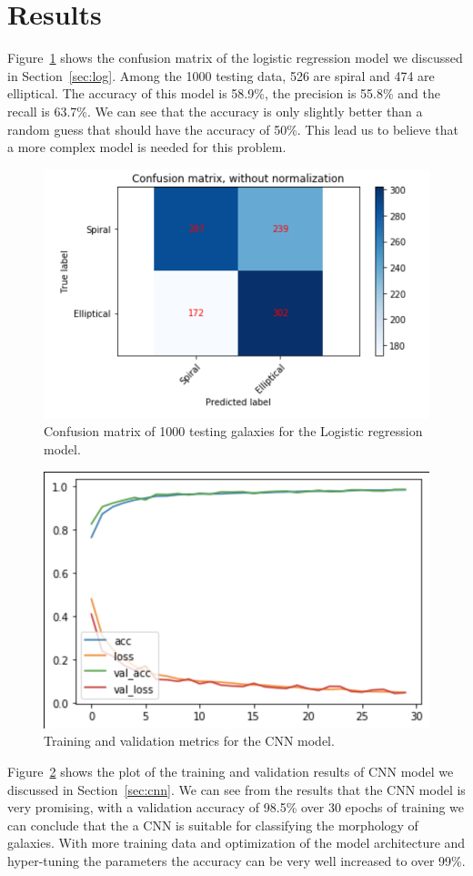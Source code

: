 \section{Results}
\label{sec:res}
Figure~\ref{fig:log_cm} shows the confusion matrix of the logistic regression model we discussed in Section~\ref{sec:log}. Among the 1000 testing data, 526 are spiral and 474 are elliptical. The accuracy of this model is 58.9\%, the precision is 55.8\% and the recall is 63.7\%. We can see that the accuracy is only slightly better than a random guess that should have the accuracy of 50\%. This lead us to believe that a more complex model is needed for this problem.

\begin{figure}[h]
	\centering
	\captionsetup{justification=centering}
	\includegraphics[width=0.6\columnwidth]{Figures/log_cm.png}
	\caption{Confusion matrix of 1000 testing galaxies for the Logistic regression model.}
	\label{fig:log_cm}
\end{figure}


\begin{figure}[h]
	\centering
	\captionsetup{justification=centering}
	\includegraphics[width=0.4\columnwidth]{Figures/CNNMetrics.png}
	\caption{Training and validation metrics for the CNN model.}
	\label{fig:cnnmetrics}
\end{figure}

Figure~\ref{fig:cnnmetrics} shows the plot of the training and validation results of CNN model we discussed in Section~\ref{sec:cnn}. 
We can see from the results that the CNN model is very promising, with a validation accuracy of 98.5\% over 30 epochs of training we can conclude that the a CNN is suitable for classifying the morphology of galaxies. With more training data and optimization of the model architecture and hyper-tuning the parameters the accuracy can be very well increased to over 99\%.